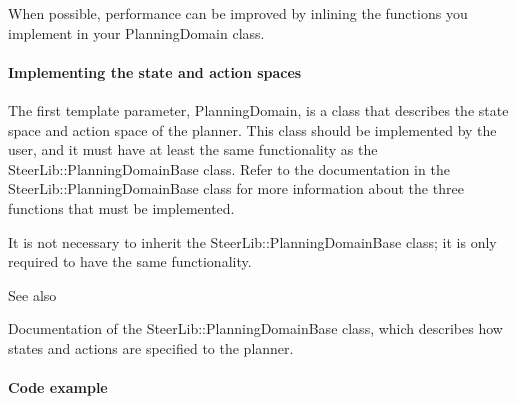 \begin{DoxyItemize}
\item When possible, performance can be improved by inlining the functions you implement in your Planning\-Domain class.
\end{DoxyItemize}

\paragraph*{Implementing the state and action spaces }

The first template parameter, Planning\-Domain, is a class that describes the state space and action space of the planner. This class should be implemented by the user, and it must have at least the same functionality as the Steer\-Lib\-::\-Planning\-Domain\-Base class. Refer to the documentation in the Steer\-Lib\-::\-Planning\-Domain\-Base class for more information about the three functions that must be implemented.

It is not necessary to inherit the Steer\-Lib\-::\-Planning\-Domain\-Base class; it is only required to have the same functionality.

\begin{DoxySeeAlso}{See also}

\begin{DoxyItemize}
\item Documentation of the Steer\-Lib\-::\-Planning\-Domain\-Base class, which describes how states and actions are specified to the planner.
\end{DoxyItemize}
\end{DoxySeeAlso}
\paragraph*{Code example }


